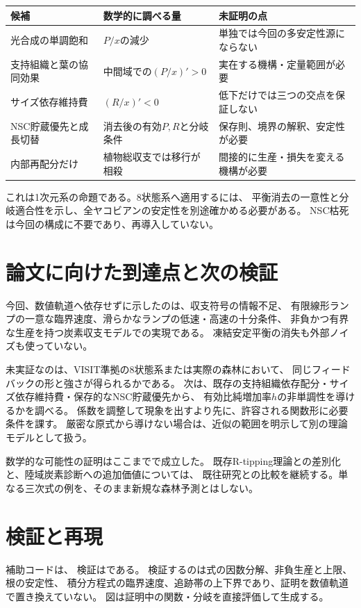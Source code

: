 \documentclass[a4paper,11pt]{ltjsarticle}
\begin{document}
\begin{longtable}{p{35mm}p{58mm}p{47mm}}
\toprule 候補&数学的に調べる量&未証明の点\\\midrule\endhead
光合成の単調飽和&$P/x$の減少&単独では今回の多安定性源にならない\\
支持組織と葉の協同効果&中間域での$(P/x)'>0$&実在する機構・定量範囲が必要\\
サイズ依存維持費&$(R/x)'<0$&低下だけでは三つの交点を保証しない\\
NSC貯蔵優先と成長切替&消去後の有効$P,R$と分岐条件&保存則、境界の解釈、安定性が必要\\
内部再配分だけ&植物総収支では移行が相殺&間接的に生産・損失を変える機構が必要\\
\bottomrule
\end{longtable}
これは1次元系の命題である。8状態系へ適用するには、
平衡消去の一意性と分岐適合性を示し、全ヤコビアンの安定性を別途確かめる必要がある。
NSC枯死は今回の構成に不要であり、再導入していない。

\section{論文に向けた到達点と次の検証}
今回、数値軌道へ依存せずに示したのは、収支符号の情報不足、
有限線形ランプの一意な臨界速度、滑らかなランプの低速・高速の十分条件、
非負かつ有界な生産を持つ炭素収支モデルでの実現である。
凍結安定平衡の消失も外部ノイズも使っていない。

未実証なのは、VISIT準拠の8状態系または実際の森林において、
同じフィードバックの形と強さが得られるかである。
次は、既存の支持組織依存配分・サイズ依存維持費・保存的なNSC貯蔵優先から、
有効比純増加率$h$の非単調性を導けるかを調べる。
係数を調整して現象を出すより先に、許容される関数形に必要条件を課す。
厳密な原式から導けない場合は、近似の範囲を明示して別の理論モデルとして扱う。

数学的な可能性の証明はここまでで成立した。
既存R-tipping理論との差別化と、陸域炭素診断への追加価値については、
既往研究との比較を継続する。単なる三次式の例を、そのまま新規な森林予測とはしない。

\section{検証と再現}
補助コードは、
検証はである。
検証するのは式の因数分解、非負生産と上限、根の安定性、
積分方程式の臨界速度、追跡帯の上下界であり、証明を数値軌道で置き換えていない。
図は証明中の関数・分岐を直接評価して生成する。
\end{document}
